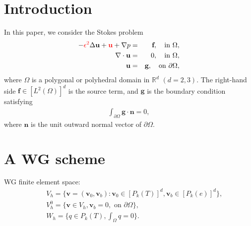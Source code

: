 \documentclass[leqno]{siamltex704}
\numberwithin{equation}{section}
\def\bu{{\mathbf{u}}}
\def\bv{{\mathbf{v}}}
\def\bn{{\mathbf{n}}}
\def\bf{{\mathbf{f}}}
\def\bg{{\mathbf{g}}}
\newcommand{\Real}{\mathbb{R}}
\begin{document}

%
%




\section{Introduction}

In this paper, we consider the Stokes problem
\begin{eqnarray}
\label{problem-eq1}-{\color{red}\epsilon^2}\Delta \textbf{u}+{\color{red}\bu}+\nabla p &=& \textbf{f}, \quad
{\rm in}\ \Omega,\\
\label{problem-eq2}\nabla \cdot\textbf{u}&=&0,\quad {\rm in}\ \Omega,
\\
\label{problem-eq3}\textbf{u}&=&\textbf{g},\quad {\rm on}\ \partial\Omega,
\end{eqnarray}
where $\Omega$ is a polygonal or polyhedral domain in $\Real^d$ $(d=2,3)$.
The right-hand side $\bf\in [L^2(\Omega)]^d$ is the source term, and
$\bg$ is the boundary condition satisfying
\begin{eqnarray*}
\int_{\partial\Omega}\bg\cdot\bn =0,
\end{eqnarray*}
where $\bn$ is the unit outward normal vector of $\partial\Omega$.

\section{A WG scheme}
WG finite element space:
\begin{eqnarray*}
  &&V_h = \{\bv=(\bv_0,\bv_b): \bv_0\in [P_k(T)]^d, \bv_b\in [P_k(e)]^d\},
  \\
  &&V_h^0 = \{\bv\in V_h, \bv_b = 0,\text{ on }\partial\Omega\},
  \\
  &&W_h = \{q\in P_k(T), \int_\Omega q = 0\}.
\end{eqnarray*}
\end{document}
